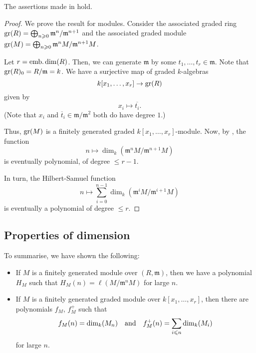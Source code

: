 \documentclass[12pt]{article}
\begin{document}
\begin{prop} \label{prop:hilbert-samuel-function}
	The assertions made in  hold.
\end{prop}
\begin{proof} 
	We prove the result for modules. Consider the associated graded ring $\operatorname{gr}(R) = \bigoplus_{n \geqslant 0} \mathfrak{m}^{n}/\mathfrak{m}^{n + 1}$ and the associated graded module $\operatorname{gr}(M) = \bigoplus_{n \geqslant 0} \mathfrak{m}^{n} M/\mathfrak{m}^{n + 1} M$.

	Let $r = \operatorname{emb.dim}(R)$. Then, we can generate $\mathfrak{m}$ by some $t_{1}, \ldots, t_{r} \in \mathfrak{m}$. Note that $\operatorname{gr}(R)_{0} = R/\mathfrak{m} = k$. We have a surjective map of graded $k$-algebras 
	\begin{equation*} 
		k[x_{1}, \ldots, x_{r}] \to \operatorname{gr}(R)
	\end{equation*}
	given by
	\begin{equation*} 
		x_{i} \mapsto \overline{t_{i}}.	
	\end{equation*}
	(Note that $x_{i}$ and $\overline{t}_{i} \in \mathfrak{m}/\mathfrak{m}^{2}$ both do have degree $1$.)

	Thus, $\operatorname{gr}(M)$ is a finitely generated graded $k[x_{1}, \ldots, x_{r}]$-module. Now, by , the function
	\begin{equation*} 
		n \mapsto \dim_{k}(\mathfrak{m}^{n} M/\mathfrak{m}^{n + 1} M)
	\end{equation*}
	is eventually polynomial, of degree $\le r - 1$.

	In turn, the Hilbert-Samuel function
	\begin{equation*} 
		n \mapsto \sum_{i = 0}^{n - 1} \dim_{k}(\mathfrak{m}^{i} M/\mathfrak{m}^{i + 1} M)
	\end{equation*}
	is eventually a polynomial of degree $\le r$.
\end{proof}

\subsection{Properties of dimension}

To summarise, we have shown the following:
\begin{itemize}
	\item If $M$ is a finitely generated module over $(R, \mathfrak{m})$, then we have a polynomial $H_{M}$ such that $H_{M}(n) = \ell(M/\mathfrak{m}^{n} M)$ for large $n$.
	\item If $M$ is a finitely generated graded module over $k[x_{1}, \ldots, x_{r}]$, then there are polynomials $f_{M}$, $f_{M}^{+}$ such that
	\begin{equation*} 
		f_{M}(n) = \dim_{k}(M_{n}) \quad\text{and}\quad f_{M}^{+}(n) = \sum_{i \leqslant n} \dim_{k}(M_{i})
	\end{equation*}
	for large $n$.
\end{itemize}
\end{document}
